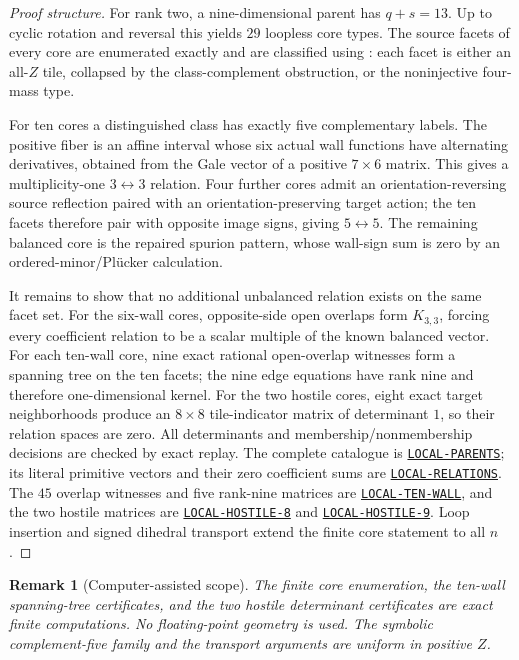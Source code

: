 \documentclass[11pt]{article}
\newtheorem{remark}[theorem]{Remark}
\newcommand{\1}{\mathbf 1}
\newcommand{\cert}[1]{\hyperref[cert:#1]{\texttt{#1}}}
\begin{document}
\begin{proof}[Proof structure]
For rank two, a nine-dimensional parent has $q+s=13$.  Up to cyclic
rotation and reversal this yields $29$ loopless core types.  The source
facets of every core are enumerated exactly and are classified using
: each facet is either an all-$Z$ tile, collapsed by
the class-complement obstruction, or the noninjective four-mass type.

For ten cores a distinguished class has exactly five complementary labels.
The positive fiber is an affine interval whose six actual wall functions
have alternating derivatives, obtained from the Gale vector of a positive
$7\times6$ matrix.  This gives a multiplicity-one $3\leftrightarrow3$
relation.  Four further cores admit an orientation-reversing source
reflection paired with an orientation-preserving target action; the ten
facets therefore pair with opposite image signs, giving
$5\leftrightarrow5$.  The remaining balanced core is the repaired spurion
pattern, whose wall-sign sum is zero by an ordered-minor/Pl\"ucker
calculation.

It remains to show that no additional unbalanced relation exists on the
same facet set.  For the six-wall cores, opposite-side open overlaps form
$K_{3,3}$, forcing every coefficient relation to be a scalar multiple of
the known balanced vector.  For each ten-wall core, nine exact rational
open-overlap witnesses form a spanning tree on the ten facets; the nine
edge equations have rank nine and therefore one-dimensional kernel.
For the two hostile cores, eight exact target neighborhoods produce an
$8\times8$ tile-indicator matrix of determinant $1$, so their relation
spaces are zero.  All determinants and membership/nonmembership decisions
are checked by exact replay.  The complete catalogue is
\cert{LOCAL-PARENTS}; its literal primitive vectors and their zero
coefficient sums are \cert{LOCAL-RELATIONS}.  The $45$ overlap witnesses
and five rank-nine matrices are \cert{LOCAL-TEN-WALL}, and the two hostile
matrices are \cert{LOCAL-HOSTILE-8} and \cert{LOCAL-HOSTILE-9}.
Loop insertion and signed dihedral
transport extend the finite core statement to all $n$.
\end{proof}

\begin{remark}[Computer-assisted scope]
The finite core enumeration, the ten-wall spanning-tree certificates, and
the two hostile determinant certificates are exact finite computations.
No floating-point geometry is used.  The symbolic complement-five family
and the transport arguments are uniform in positive $Z$.
\end{remark}
\end{document}
